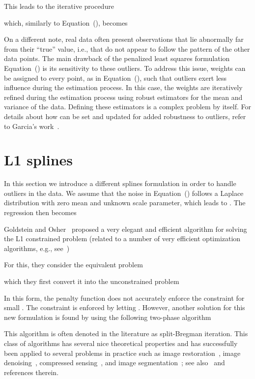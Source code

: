 \documentclass[preprint]{imsart}
\begin{document}
This leads to the iterative procedure

which, similarly to Equation~(), becomes


On a different note, real data often present observations that lie abnormally far from their ``true'' value, i.e., that do not appear to follow the pattern of the other data points.
The main drawback of the penalized least squares formulation Equation~() is its sensitivity to these outliers.
To address this issue, weights can be assigned to every point, as in Equation~(), such that outliers exert less influence during the estimation process.
In this case, the weights are iteratively refined during the estimation process using robust estimators for the mean and variance of the data. Defining these estimators is a complex problem by itself. For details about how  can be set and updated for added robustness to outliers, refer to Garcia's work~\cite{garcia10}.



\section{L1 splines}
\label{sec:L1splines}

In this section we introduce a different splines formulation in order to handle outliers in the data. We assume that the noise  in Equation~() follows a Laplace distribution with zero mean and unknown scale parameter, which leads to . The regression then becomes


Goldstein and Osher~\cite{goldstein09} proposed a very elegant and efficient algorithm for solving the L1 constrained problem
(related to a number of very efficient optimization algorithms, e.g., see~\cite{combettes11})

For this, they consider the equivalent problem

which they first convert it into the unconstrained problem

In this form, the penalty function does not accurately enforce the constraint for small . The constraint is enforced by letting .
However, another solution for this new formulation is found by using the following two-phase algorithm

This algorithm is often denoted in the literature as split-Bregman iteration. This class of algorithms has several nice theoretical properties and has successfully been applied to several problems in practice such as image restoration~\cite{osher05}, image denoising~\cite{xu07}, compressed sensing~\cite{yin08}, and image segmentation~\cite{goldstein10}; see also~\cite{combettes11} and references therein.
\end{document}
